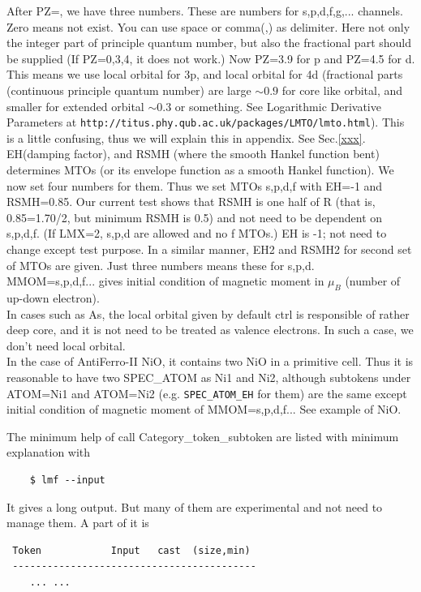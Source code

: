 \documentclass[a4paper,10pt,epsf,fleqn]{article}
\begin{document}
{\begin{itemize}
After PZ=, we have three numbers.
These are numbers for s,p,d,f,g,... channels. Zero means not exist.
You can use space or comma(,) as delimiter. 
Here not only the integer part of principle quantum number, but also 
the fractional part should be supplied (If PZ=0,3,4, it does not work.)
Now PZ=3.9 for p and PZ=4.5 for d. This means we use local orbital for
3p, and local orbital for 4d (fractional parts (continuous principle quantum number) 
are large $\sim 0.9$ for core like orbital, and smaller for extended
orbital $\sim 0.3$ or something. See Logarithmic Derivative Parameters
at \verb+http://titus.phy.qub.ac.uk/packages/LMTO/lmto.html+).
This is a little confusing, thus we will explain this in appendix. See Sec.\ref{xxx}.\\

EH(damping factor), and RSMH (where the smooth Hankel function bent)
determines MTOs (or its envelope function as a smooth Hankel function). 
We now set four numbers for them. Thus we set MTOs
s,p,d,f with EH=-1 and RSMH=0.85. Our current test shows that RSMH is
one half of R (that is, 0.85=1.70/2, but minimum RSMH is 0.5) 
and not need to be dependent on s,p,d,f. (If LMX=2, s,p,d are allowed and no f MTOs.)
EH is -1; not need to change except test purpose.
In a similar manner, EH2 and RSMH2 for second set of MTOs are given.
Just three numbers means these for s,p,d. \\

MMOM=s,p,d,f... gives initial condition of magnetic moment in $\mu_B$
(number of up-down electron).\\

In cases such as As, the local orbital given by default ctrl
is responsible of rather deep core, and it is not need to be treated 
as valence electrons. In such a case,
we don't need local orbital.\\

In the case of AntiFerro-II NiO, it contains 
two NiO in a primitive cell. Thus it is reasonable to have two SPEC\_ATOM
as Ni1 and Ni2, although subtokens under
ATOM=Ni1 and ATOM=Ni2 (e.g. \verb+SPEC_ATOM_EH+ for them) are the same
except initial condition of magnetic moment of MMOM=s,p,d,f...
See example of NiO.
\end{itemize}

The minimum help of call Category\_token\_subtoken are listed with
minimum explanation with 
\begin{verbatim}
    $ lmf --input
\end{verbatim}
It gives a long output. But many of them are experimental and not need
to manage them. A part of it is
\begin{verbatim}
 Token            Input   cast  (size,min)
 ------------------------------------------
    ... ...


\end{verbatim}}
\end{document}
